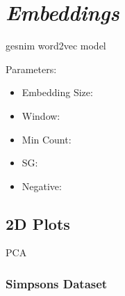 \section{\textit{Embeddings}}

gesnim word2vec model

Parameters:
\begin{itemize}
    \item Embedding Size:
    
    \item Window:
    
    \item Min Count:
    
    \item SG:
    
    \item Negative:
\end{itemize}

\subsection{2D Plots}

PCA

\subsubsection{Simpsons Dataset}



